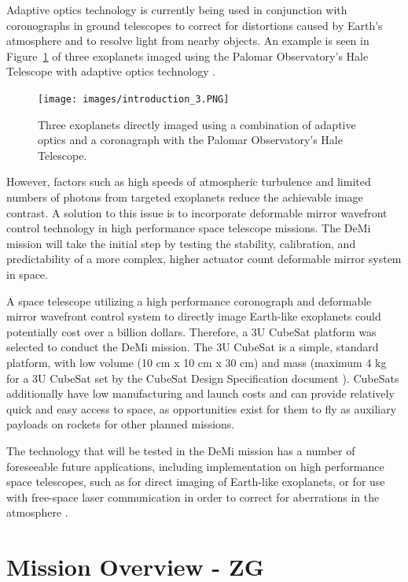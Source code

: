\documentclass[12pt]{article}
\begin{document}
Adaptive optics technology is currently being used in conjunction with coronographs in ground telescopes to correct for distortions caused by Earth's atmosphere and to resolve light from nearby objects.  An example is seen in Figure~\ref{fig:Intro_exo} of three exoplanets imaged using the Palomar Observatory's Hale Telescope with adaptive optics technology \cite{serabyn2010}.

\begin{figure}[!ht]
\centering
\texttt{[image: images/introduction\_3.PNG]}
\caption{Three exoplanets directly imaged using a combination of adaptive optics and a coronagraph with the Palomar Observatory's Hale Telescope.}
\label{fig:Intro_exo}
\end{figure}

However, factors such as high speeds of atmospheric turbulence and limited numbers of photons from targeted exoplanets reduce the achievable image contrast.  A solution to this issue is to incorporate deformable mirror wavefront control technology in high performance space telescope missions.  The DeMi mission will take the initial step by testing the stability, calibration, and predictability of a more complex, higher actuator count deformable mirror system in space.     

A space telescope utilizing a high performance coronograph and deformable mirror wavefront control system to directly image Earth-like exoplanets could potentially cost over a billion dollars.  Therefore, a 3U CubeSat platform was selected to conduct the DeMi mission.  The 3U CubeSat is a simple, standard platform, with low volume (10 cm x 10 cm x 30 cm) and mass (maximum 4 kg for a 3U CubeSat set by the CubeSat Design Specification document \cite{cubesat-specs}).   CubeSats additionally have low manufacturing and launch costs and can provide relatively quick and easy access to space, as opportunities exist for them to fly as auxiliary payloads on rockets for other planned missions. 

The technology that will be tested in the DeMi mission has a number of foreseeable future applications, including implementation on high performance space telescopes, such as for direct imaging of Earth-like exoplanets, or for use with free-space laser communication in order to correct for aberrations in the atmosphere \cite{cahoy-unpublished}.

\newpage
\section{Mission Overview - ZG}
\end{document}
